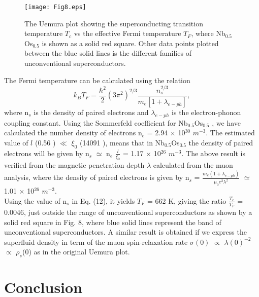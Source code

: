 \documentclass[reprint, superscriptaddress, secnumarabic, amssymb, nobibnotes, aps, prl]{revtex4-1}
\begin{document}
\begin{figure}
\texttt{[image: Fig8.eps]}
\caption{\label{Fig8:up} The Uemura plot showing the superconducting transition temperature $T_{c}$ vs the effective Fermi temperature $T_{F}$, where Nb$_{0.5}$Os$_{0.5}$ is shown as a solid red square. Other data points plotted between the blue solid lines is the different families of unconventional superconductors.}
\end{figure}
The Fermi temperature can be calculated using the relation 
\begin{equation}
k_{B}T_{F} = \frac{\hbar^{2}}{2}(3\pi^{2})^{2/3}\frac{n_{s}^{2/3}}{m_{e}[1+\lambda_{e-ph}]} ,
\label{eqn12:ft}
\end{equation}
where n$_{s}$ is the density of paired electrons and $\lambda_{e-ph}$ is the electron-phonon coupling constant.
Using the Sommerfeld coefficient for Nb$_{0.5}$Os$_{0.5}$ \cite{ck}, we have calculated the number density of electrons n$_{e}$ = 2.94 $\times$ 10$^{30}$ $m^{-3}$. The estimated value of $\textit{l}$ (0.56 \text{\AA}) $\ll$ $\xi_{0}$ (14091 \text{\AA}), means that in Nb$_{0.5}$Os$_{0.5}$ the density of paired electrons will be given by n$_{s}$ $\simeq$ n$_{e}$ $\frac{\textit{l}}{\xi_{0}}$ = 1.17 $\times$ 10$^{26}$ $m^{-3}$. The above result is verified from the magnetic penetration depth $\lambda$ calculated from the muon analysis, where the density of paired electrons is given by n$_{s}$ = $\frac{m_{e}(1+ \lambda_{e-ph})}{\mu_{0}e^{2}\lambda^{2}}$ $\simeq$ 1.01 $\times$ 10$^{26}$ $m^{-3}$.\\ 
Using the value of n$_{s}$ in Eq. (12), it yields $T_{F}$ = 662 K, giving the ratio $\frac{T_{c}}{T_{F}}$ = 0.0046, just outside the range of unconventional superconductors as shown by a solid red square in Fig. 8, where blue solid lines represent the band of unconventional superconductors. A similar result is obtained if we express the superfluid density in term of the muon spin-relaxation rate $\sigma(0)$ $\propto$ $\lambda(0)^{-2}$ $\propto$ $\rho_{s}$(0) as in the original Uemura plot.
\section{Conclusion}
\end{document}

